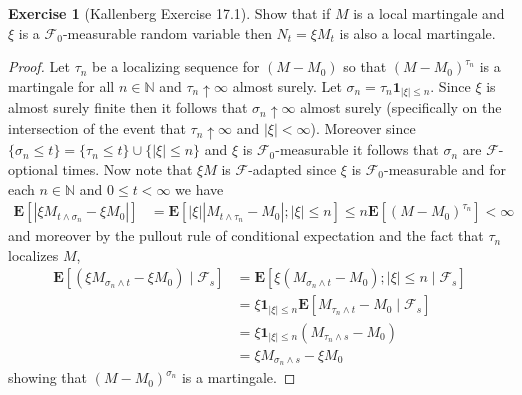 \documentclass{amsbook}
\theoremstyle{definition}
\newtheorem{xca}{Exercise}
\theoremstyle{remark}
\newcommand{\expectation}[1]{\textbf{E}\left[#1\right]}
\newcommand{\cexpectationlong}[2]{\textbf{E}\left[ #2 \mid #1 \right]}
\newcommand{\characteristic}[1]{\textbf{1}_{#1}}
\newcommand{\naturals}{\mathbb{N}}
\newcommand{\abs}[1]{\left \vert #1 \right \vert}
\begin{document}
\begin{xca}[Kallenberg Exercise 17.1]Show that if $M$ is a local
  martingale and $\xi$ is a $\mathcal{F}_0$-measurable random variable 
then $N_t = \xi M_t$ is also a local martingale.
\end{xca}
\begin{proof}
Let $\tau_n$ be a localizing sequence for $(M-M_0)$ so that
$(M-M_0)^{\tau_n}$ is a martingale for all $n \in \naturals$ and
$\tau_n \uparrow \infty$ almost surely.  Let $\sigma_n = \tau_n
\characteristic{\abs{\xi} \leq n}$.  Since $\xi$ is almost surely
finite then it follows that $\sigma_n \uparrow \infty$ almost surely
(specifically on the intersection of the event that $\tau_n \uparrow
\infty$ and $\abs{\xi} < \infty$).  Moreover since $\lbrace \sigma_n
\leq t \rbrace = \lbrace\tau_n \leq t \rbrace \cup \lbrace \abs{\xi}
\leq n \rbrace$ and $\xi$ is $\mathcal{F}_0$-measurable it follows
that $\sigma_n$ are $\mathcal{F}$-optional times.  Now note that
$\xi M$ is $\mathcal{F}$-adapted since $\xi$ is
$\mathcal{F}_0$-measurable
and for each $n \in \naturals$  and $0 \leq t < \infty$ we have
\begin{align*}
\expectation{\abs{\xi M_{t \wedge \sigma_n} - \xi M_0}} 
&= \expectation{\abs{\xi} \abs{M_{t \wedge \tau_n} - M_0} ; \abs{\xi}
  \leq n} 
\leq  n \expectation{( M -
  M_0)^{\tau_n}} < \infty
\end{align*} 
and moreover by the pullout rule of
conditional expectation and the fact that $\tau_n$ localizes $M$,
\begin{align*}
\cexpectationlong{\mathcal{F}_s}{(\xi M_{\sigma_n \wedge t} - \xi M_0)}
&=\cexpectationlong{\mathcal{F}_s}{\xi  (M_{\sigma_n \wedge t} - M_0)
  ; \abs{\xi} \leq n} \\
&= \xi \characteristic{\abs{\xi} \leq n}  \cexpectationlong{\mathcal{F}_s}{M_{\tau_n \wedge t} - M_0} \\
&= \xi \characteristic{\abs{\xi} \leq n} (M_{\tau_n \wedge s} - M_0) \\
&= \xi M_{\sigma_n \wedge s} - \xi M_0
\end{align*}
showing that $(M-M_0)^{\sigma_n}$ is a martingale.
\end{proof}
\end{document}

